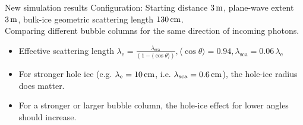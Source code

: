 \begin{frame}[fragile]{New simulation results}
  \tiny Configuration: Starting distance $3\text{\,m}$, plane-wave extent $3\text{\,m}$, bulk-ice geometric scattering length $130\text{\,cm}$. \\
    Comparing different bubble columns for the same direction of incoming photons.
  \normalsize

  \begin{itemize}
    \item Effective scattering length $\lambda_\text{e} = \frac{\lambda_\text{sca}}{(1 - \langle\cos \theta\rangle)}, \langle\cos \theta\rangle = 0.94, \lambda_\text{sca} = 0.06\,\lambda_\text{e}$
    \item For stronger hole ice (e.g. $\lambda_\text{e} = 10\text{\,cm}$, i.e. $\lambda_\text{sca} = 0.6\text{\,cm}$), the hole-ice radius does matter. \checkmark
    \item For a stronger or larger bubble column, the hole-ice effect for lower angles should increase. \checkmark
  \end{itemize}
\end{frame}

